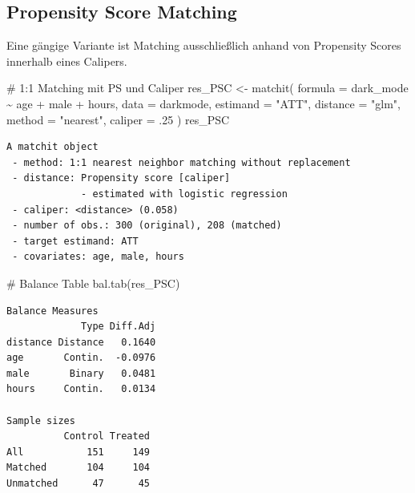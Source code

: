 \documentclass[
  a4paper,
  DIV=11,
  oneside]{scrreprt}
\newenvironment{Shaded}{\begin{snugshade}}{\end{snugshade}}
\newcommand{\AttributeTok}[1]{\textcolor[rgb]{0.40,0.45,0.13}{#1}}
\newcommand{\CommentTok}[1]{\textcolor[rgb]{0.37,0.37,0.37}{#1}}
\newcommand{\DecValTok}[1]{\textcolor[rgb]{0.68,0.00,0.00}{#1}}
\newcommand{\FunctionTok}[1]{\textcolor[rgb]{0.28,0.35,0.67}{#1}}
\newcommand{\NormalTok}[1]{\textcolor[rgb]{0.00,0.23,0.31}{#1}}
\newcommand{\OtherTok}[1]{\textcolor[rgb]{0.00,0.23,0.31}{#1}}
\newcommand{\SpecialCharTok}[1]{\textcolor[rgb]{0.37,0.37,0.37}{#1}}
\newcommand{\StringTok}[1]{\textcolor[rgb]{0.13,0.47,0.30}{#1}}
\begin{document}
\hypertarget{propensity-score-matching}{%
\subsection{Propensity Score Matching}\label{propensity-score-matching}}

Eine gängige Variante ist Matching ausschließlich anhand von Propensity
Scores innerhalb eines Calipers.

\begin{Shaded}
\begin{Highlighting}[]
\CommentTok{\# 1:1 Matching mit PS und Caliper}
\NormalTok{res\_PSC }\OtherTok{\textless{}{-}} \FunctionTok{matchit}\NormalTok{(}
  \AttributeTok{formula =}\NormalTok{ dark\_mode }\SpecialCharTok{\textasciitilde{}}\NormalTok{ age }\SpecialCharTok{+}\NormalTok{ male }\SpecialCharTok{+}\NormalTok{ hours, }
  \AttributeTok{data =}\NormalTok{ darkmode, }
  \AttributeTok{estimand =} \StringTok{"ATT"}\NormalTok{,}
  \AttributeTok{distance =} \StringTok{"glm"}\NormalTok{, }
  \AttributeTok{method =} \StringTok{"nearest"}\NormalTok{, }
  \AttributeTok{caliper =}\NormalTok{ .}\DecValTok{25}
\NormalTok{)}
\NormalTok{res\_PSC}
\end{Highlighting}
\end{Shaded}

\begin{verbatim}
A matchit object
 - method: 1:1 nearest neighbor matching without replacement
 - distance: Propensity score [caliper]
             - estimated with logistic regression
 - caliper: <distance> (0.058)
 - number of obs.: 300 (original), 208 (matched)
 - target estimand: ATT
 - covariates: age, male, hours
\end{verbatim}

\begin{Shaded}
\begin{Highlighting}[]
\CommentTok{\# Balance Table}
\FunctionTok{bal.tab}\NormalTok{(res\_PSC)}
\end{Highlighting}
\end{Shaded}

\begin{verbatim}
Balance Measures
             Type Diff.Adj
distance Distance   0.1640
age       Contin.  -0.0976
male       Binary   0.0481
hours     Contin.   0.0134

Sample sizes
          Control Treated
All           151     149
Matched       104     104
Unmatched      47      45
\end{verbatim}
\end{document}
